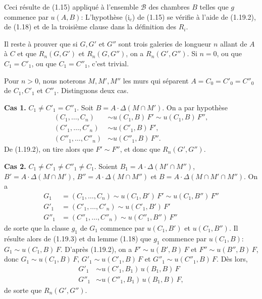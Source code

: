 \documentclass[12pt]{article}
\theoremstyle{remark}
\begin{document}
Ceci résulte de (1.15) appliqué à l'ensemble $\mathscr{B}$ des chambres $B$ telles que $g$ commence par $u(A, B)$: L'hypothèse (i$_c$) de (1.15) se vérifie à l'aide de (1.19.2), de (1.18) et de la troisième clause dans la définition des $R_i$.

Il reste à prouver que si $G, G'$ et $G''$ sont trois galeries de longueur $n$ allant de $A$ à $C$ et que $R_n(G, G')$ et $R_n(G, G'')$, on a $R_n(G', G'')$. Si $n = 0$, ou que $C_1 = C'_1$, ou que $C_1 = C''_1$, c'est trivial.

Pour $n > 0$, nous noterons $M, M', M''$ les murs qui séparent $A = C_0 = C'_0 = C''_0$ de $C_1, C'_1$ et $C''_1$. Distinguons deux cas.

\textbf{Cas 1.} $C_1 \neq C'_1 = C''_1$. Soit $B = A \cdot \Delta(M \cap M')$. On a par hypothèse
\begin{align*}(C_1, \ldots, C_n) &\sim u(C_1, B) \, F' \sim u(C_1, B) \, F'', \\(C'_1, \ldots, C'_n) &\sim u(C'_1, B) \, F', \\(C''_1, \ldots, C''_n) &\sim u(C''_1, B) \, F''.\end{align*}
De (1.19.2), on tire alors que $F' \sim F''$, et donc que $R_n(G', G'')$.

\textbf{Cas 2.} $C_1 \neq C'_1 \neq C''_1 \neq C_1$. Soient $B_1 = A \cdot \Delta(M' \cap M'')$, $B' = A \cdot \Delta(M \cap M')$, $B'' = A \cdot \Delta(M \cap M'')$ et $B = A \cdot \Delta(M \cap M' \cap M'')$. On a
\begin{align*}G_1 &= (C_1, \ldots, C_n) \sim u(C_1, B') \, F' \sim u(C_1, B'') \, F'' \\G'_1 &= (C'_1, \ldots, C'_n) \sim u(C'_1, B') \, F' \\G''_1 &= (C''_1, \ldots, C''_n) \sim u(C''_1, B'') \, F''\end{align*}
de sorte que la classe $g_1$ de $G_1$ commence par $u(C_1, B')$ et $u(C_1, B'')$. Il résulte alors de (1.19.3) et du lemme (1.18) que $g_1$ commence par $u(C_1, B)$: $G_1 \sim u(C_1, B) \, F$. D'après (1.19.2), on a $F' \sim u(B', B) \, F$ et $F'' \sim u(B'', B) \, F$, donc $G_1 \sim u(C_1, B) \, F$, $G'_1 \sim u(C'_1, B) \, F$ et $G''_1 \sim u(C''_1, B) \, F$. Dès lors,
\begin{align*}G'_1 &\sim u(C'_1, B_1) \, u(B_1, B) \, F \\G''_1 &\sim u(C''_1, B_1) \, u(B_1, B) \, F,\end{align*}
de sorte que $R_n(G', G'')$.

\begin{center}
\end{center}
\end{document}
